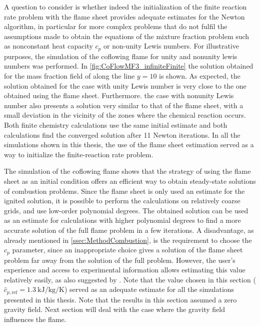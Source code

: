 A question to consider is whether indeed the initialization of the finite reaction rate problem with the flame sheet provides adequate estimates for the Newton algorithm, in particular for more complex problems that do not fulfil the assumptions made to obtain the equations of the mixture fraction problem such as nonconstant heat capacity $c_p$ or non-unity Lewis numbers. 
For illustrative purposes, the simulation of the coflowing flame for unity and nonunity lewis numbers was performed. In \cref{fig:CoFlowMF3_infiniteFinite} the solution obtained for the mass fraction field of  along the line $y=10$ is shown. As expected, the solution obtained for the case with unity Lewis number is very close to the one obtained using the flame sheet. Furthermore. the case with nonunity Lewis number also presents a solution very similar to that of the flame sheet, with a small deviation in the vicinity of the zones where the chemical reaction occurs.  Both finite chemistry calculations use the same initial estimate and both calculations find the converged solution after 11 Newton iterations.
In all the simulations shown in this thesis, the use of the flame sheet estimation served as a way to initialize the finite-reaction rate problem.

The simulation of the coflowing flame shows that the strategy of using the flame sheet as an initial condition offers an efficient way to obtain steady-state solutions of combustion problems. Since the flame sheet is only used an estimate for the ignited solution, it is possible to perform the calculations on relatively coarse grids, and use low-order polynomial degrees. The obtained solution can be used as an estimate for calculations with higher polynomial degrees to find a more accurate solution of the full flame problem in a few iterations. A disadvantage, as already mentioned in \cref{ssec:MethodCombustion}, is the requirement to choose  the $c_p$ parameter, since an inappropriate choice gives a solution of the flame sheet problem far away from the solution of the full problem. However, the user's experience and access to experimental information allows estimating this value relatively easily, as also suggested by \cite{smookeNumericalSolutionTwoDimensional1986a}. Note that the value chosen in this section ($\hat{c}_{p,\text{ref}}= \SI{1.3}{\kilo \joule \per \kilo \gram \per \kelvin}$)  served as an adequate estimate for all the simulations presented in this thesis.  Note that the results in this section assumed a zero gravity field. Next section will deal with the case where the gravity field influences the flame.

